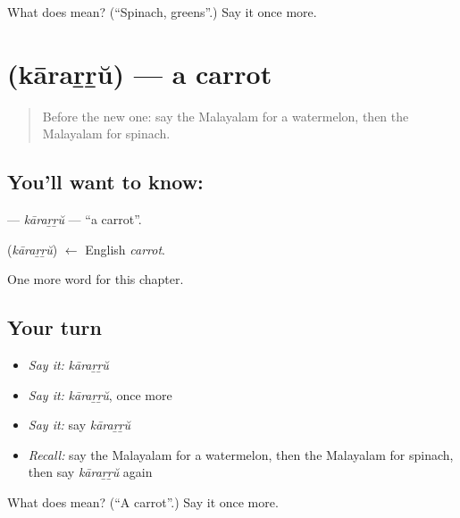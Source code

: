 \begin{tcolorbox}[breakable,colback=teal!4,colframe=teal!35!black,title={Before you move on}]
What does  mean? (\textquotedblleft{}Spinach, greens\textquotedblright{}.) Say it once more.
\end{tcolorbox}
\section[\texorpdfstring{\ml{കാരറ്റ്} (kāraṟṟŭ)}{കാരറ്റ് (kāraṟṟŭ)}]{ (kāraṟṟŭ) — a carrot}

\label{lesson:ML-C323-kararru}



\begin{quote}
Before the new one: say the Malayalam for a watermelon, then the Malayalam for spinach.
\end{quote}

\subsection*{You'll want to know: }
\textbf{} — \emph{kāraṟṟŭ} — \textquotedblleft{}a carrot\textquotedblright{}.

\begin{cousinweb}
\textbf{} (\emph{kāraṟṟŭ}) $\leftarrow$ English \emph{carrot}.
\end{cousinweb}

\begin{grammarlens}[title={What you've built}]
One more word for this chapter.
\end{grammarlens}

\subsection*{Your turn}
\begin{itemize}
\raggedright
  \item \emph{Say it:} \emph{kāraṟṟŭ}
  \item \emph{Say it:} \emph{kāraṟṟŭ}, once more
  \item \emph{Say it:} say \emph{kāraṟṟŭ}
  \item \emph{Recall:} say the Malayalam for a watermelon, then the Malayalam for spinach, then say \emph{kāraṟṟŭ} again
\end{itemize}

\begin{tcolorbox}[breakable,colback=teal!4,colframe=teal!35!black,title={Before you move on}]
What does  mean? (\textquotedblleft{}A carrot\textquotedblright{}.) Say it once more.
\end{tcolorbox}
